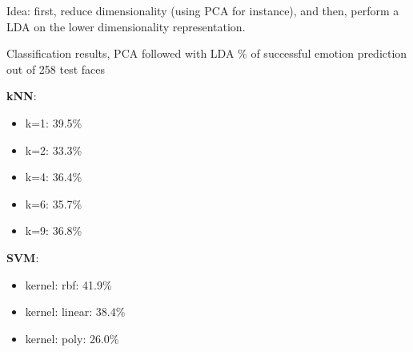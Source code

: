 \documentclass[compress]{beamer}
\begin{document}

\begin{frame}{}

    Idea: first, reduce dimensionality (using PCA for instance), and then,
    perform a LDA on the lower dimensionality representation.
\end{frame}



\begin{frame}{Classification results, PCA followed with LDA}
    \% of successful emotion prediction out of 258 test faces

    {\bf kNN}:
    \begin{itemize}
        \item k=1: 39.5\%
        \item k=2: 33.3\%
        \item k=4: 36.4\%
        \item k=6: 35.7\%
        \item k=9: 36.8\%
    \end{itemize}

    {\bf SVM}:

    \begin{itemize}
        \item kernel: rbf: 41.9\%
        \item kernel: linear: 38.4\%
        \item kernel: poly: 26.0\%
    \end{itemize}
\end{frame}
\end{document}

